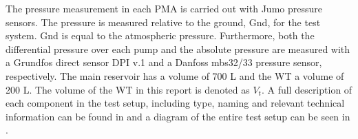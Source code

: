 The pressure measurement in each PMA is carried out with Jumo pressure sensors. The pressure is measured relative to the ground, Gnd, for the test system. Gnd is equal to the atmospheric pressure. Furthermore, both the differential pressure over each pump and the absolute pressure are measured with a Grundfos direct sensor DPI v.1 and a Danfoss mbs32/33 pressure sensor, respectively. The main reservoir has a volume of 700 L and the WT a volume of 200 L. The volume of the WT in this report is denoted as $V_t$. A full description of each component in the test setup, including type, naming and relevant technical information can be found in  and a diagram of the entire test setup can be seen in .
